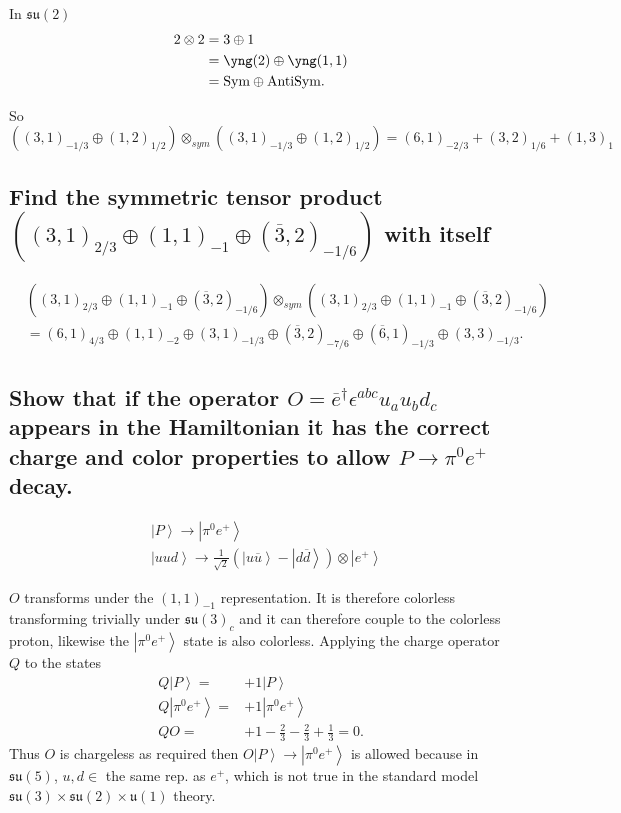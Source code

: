 \documentclass[main.tex]{subfiles}
\begin{document}
In $\mathfrak{su}(2)$
\begin{align}
2\otimes2&=3\oplus1\\
&=\yng(2)\oplus\yng(1,1)\\
&=\text{Sym}\oplus\text{AntiSym.}
\end{align}

So 
\begin{equation}
\left((3,1)_{-1/3}\oplus(1,2)_{1/2}\right)\otimes_{sym}\left((3,1)_{-1/3}\oplus(1,2)_{1/2}\right)=(6,1)_{-2/3}+(3,2)_{1/6}+(1,3)_{1}
\end{equation}

\subsection{Find the symmetric tensor product $\left((3,1)_{2/3}\oplus(1,1)_{-1}\oplus(\overline{3},2)_{-1/6}\right)$ with itself}

\begin{align}
&\left((3,1)_{2/3}\oplus(1,1)_{-1}\oplus(\overline{3},2)_{-1/6}\right)\otimes_{sym}\left((3,1)_{2/3}\oplus(1,1)_{-1}\oplus(\overline{3},2)_{-1/6}\right)\nonumber\\
&=(6,1)_{4/3}\oplus(1,1)_{-2}\oplus(3,1)_{-1/3}\oplus(\overline{3},2)_{-7/6}\oplus(\overline{6},1)_{-1/3}\oplus(3,3)_{-1/3}.
\end{align}

\subsection{Show that if the operator $O=\overline{e}^{\dagger}\epsilon^{abc}u_au_bd_c$ appears in the Hamiltonian it has the correct charge and color properties to allow $P\rightarrow\pi^0e^+$ decay.}
\begin{align}
&\left|P\right>\rightarrow\left|\pi^0e^+\right>\\
&\left|uud\right>\rightarrow\frac{1}{\sqrt{2}}\left(\left|u\overline{u}\right>-\left|d\overline{d}\right>\right)\otimes\left|e^+\right>
\end{align}

$O$ transforms under the $(1,1)_{-1}$ representation. It is therefore colorless transforming trivially under $\mathfrak{su}(3)_c$ and it can therefore couple to the colorless proton, likewise the  $\left|\pi^0e^+\right>$ state is also colorless.
Applying the charge operator $Q$ to the states
\begin{align}
Q\left|P\right>=&+1\left|P\right>\\
Q\left|\pi^0e^+\right>=&+1\left|\pi^0e^+\right>\\
QO=&+1-\frac{2}{3}-\frac{2}{3}+\frac{1}{3}=0.
\end{align}
Thus $O$ is chargeless as required then $O\left|P\right>\rightarrow\left|\pi^0e^+\right>$ is allowed because in $\mathfrak{su}(5)$, $u,d\in$ the same rep. as $e^+$, which is not true in the standard model $\mathfrak{su}(3)\times\mathfrak{su}(2)\times\mathfrak{u}(1)$ theory.
\end{document}
